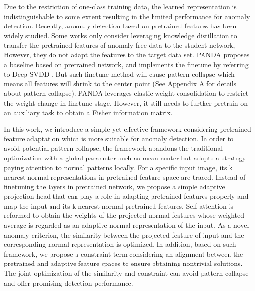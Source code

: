 \documentclass{article}
\begin{document}
Due to the restriction of one-class training data, the learned representation is indistinguishable to some extent resulting in the limited performance for anomaly detection. Recently, anomaly detection based on pretrained features has been widely studied. Some works \cite{bergmann2020uninformed,salehi2021multiresolution} only consider leveraging knowledge distillation to transfer the pretrained features of anomaly-free data to the student network, However, they do not adapt the features to the target data set. PANDA \cite{reiss2021panda} proposes a baseline based on pretrained network, and implements the finetune by referring to Deep-SVDD \cite{ruff2018deep}. But such finetune method will cause pattern collapse which means all features will shrink to the center point (See Appendix A for details about pattern collapse). PANDA leverages elastic weight consolidation to restrict the weight change in finetune stage. However, it still needs to further pretrain on an auxiliary task to obtain a Fisher information matrix.

In this work, we introduce a simple yet effective framework considering pretrained feature adaptation which is more suitable for anomaly detection. In order to avoid potential pattern collapse, the framework abandons the traditional optimization with a global parameter such as mean center but adopts a strategy paying attention to normal patterns locally. For a specific input image, its k nearest normal representations in pretrained feature space are traced. Instead of finetuning the layers in pretrained network, we propose a simple adaptive projection head that can play a role in adapting pretrained features properly and map the input and its k nearest normal pretrained features. Self-attention \cite{vaswani2017attention} is reformed to obtain the weights of the projected normal features whose weighted average is regarded as an adaptive normal representation of the input. As a novel anomaly criterion, the similarity between the projected feature of input and the corresponding normal representation is optimized. In addition, based on such framework, we propose a constraint term considering an alignment between the pretrained and adaptive feature spaces to ensure obtaining nontrivial solutions. The joint optimization of the similarity and constraint can avoid pattern collapse and offer promising detection performance.
\end{document}

